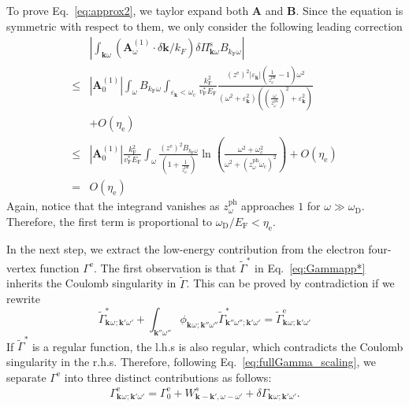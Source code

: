 \documentclass[%
 reprint,
superscriptaddress,
 amsmath,amssymb,
 aps,
prx,
]{revtex4-2}
\newcommand{\bk}{\mathbf{k}}
\newcommand{\Gammapp}{\tilde{\Gamma}}
\newcommand{\txc}{\text{c}}
\newcommand{\txe}{\text{e}}
\newcommand{\txs}{\text{s}}
\newcommand{\txD}{\text{D}}
\newcommand{\txF}{\text{F}}
\newcommand{\txph}{\text{ph}}
\begin{document}
\begin{appendices}
To prove Eq.~\eqref{eq:approx2}, we taylor expand both $\mathbf{A}$ and $\mathbf{B}$. Since the equation is symmetric with respect to them, we only consider the following leading correction
\begin{equation}
\begin{split}
 &\left|\int_{\bk\omega} (\mathbf{A}^{(1)}_{\omega}\cdot\delta{\bk}/k_F)\delta\Pi^{\txs}_{\bk\omega}B_{k_{\txF}\omega}\right|\\
 \le &|\mathbf{A}^{(1)}_{0}| \int_{\omega} B_{k_{\txF}\omega}
 \int_{\varepsilon_\bk<\omega_\txc}\frac{k_\txF^2}{v_\txF^*E_\txF}\frac{(z^{\txe})^2\left|\varepsilon_\bk\right|\left(\frac{1}{{z^{\txph}_\omega}}-1\right)\omega^2}{(\omega^2+\varepsilon_{\bk}^2)\left(\left(\frac{\omega}{z^{\txph}_\omega}\right)^2+\varepsilon_{\bk}^2\right)}\\
 &+O(\eta_\txe)\\
 \le &|\mathbf{A}^{(1)}_{0}|\frac{k_\txF^2}{v_\txF^*E_\txF}
  \int_{\omega}   \frac{(z^{\txe})^2 B_{k_{\txF}\omega}}{(1+\frac{1}{z^{\txph}_\omega})}\ln{ \left( \frac{\omega^2+\omega_\txc^2}{\omega^2+(z^{\txph}_{\omega}\omega_\txc)^2}\right)}+O(\eta_\txe)\\
 =&O(\eta_\txe)
\end{split}
\end{equation}
Again, notice that the integrand vanishes as $z^{\txph}_{\omega}$ approaches $1$ for $\omega \gg \omega_\txD$. Therefore, the first term is proportional to $\omega_\txD/E_\txF<\eta_\txe$.

In the next step, we extract the low-energy contribution from the electron four-vertex function $\Gamma^{\txe}$. The first observation is that $\Gammapp^{*}$ in Eq.~\eqref{eq:Gammapp*}  inherits the Coulomb singularity in $\Gammapp$. This can be proved by contradiction if we rewrite
\begin{equation}
    \Gammapp^{*}_{\bk^{}\omega^{};\bk'\omega'}  + \int_{\bk''\omega''} \phi_{\bk^{}\omega^{};\bk''\omega''} \Gammapp^{*}_{\bk''\omega'';\bk'\omega'}= \Gammapp^{\txe}_{\bk^{}\omega^{};\bk'\omega'}
\end{equation}
If $\Gammapp^{*}$ is a regular function, the l.h.s is also regular, which contradicts the Coulomb singularity in the r.h.s. Therefore, following Eq.~\eqref{eq:fullGamma_scaling},  we separate $\Gamma^{\txe}$ into three distinct contributions as follows:
\begin{eqnarray}
\label{eq:components}
  \Gamma^{\txe}_{\bk^{}\omega^{};\bk'\omega'}=\Gamma^{\txe}_0 + W^s_{\bk^{}-\bk', \omega^{}-\omega'} + \delta{\Gamma}_{\bk^{}\omega^{};\bk'\omega'}.
\end{eqnarray}


\end{appendices}
\end{document}
